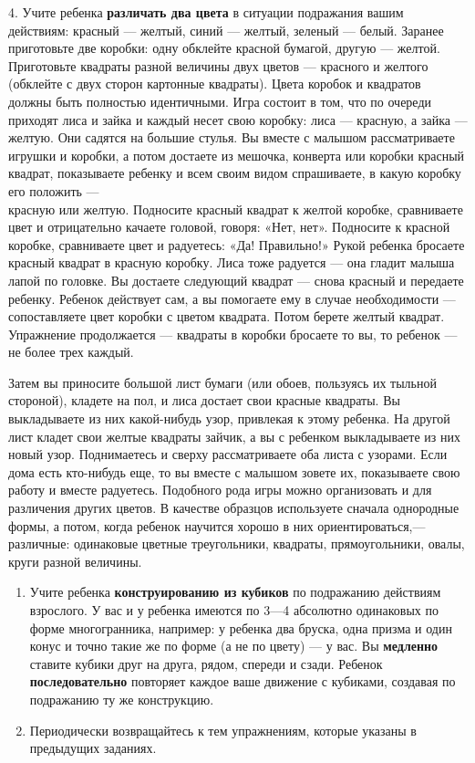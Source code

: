 \documentclass{book}
\begin{document}
4. Учите ребенка \textbf{различать два цвета} в ситуации подражания
вашим действиям: красный --- желтый, синий --- желтый, зеленый ---
белый. Заранее приготовьте две коробки: одну обклейте красной бумагой,
другую --- желтой. Приготовьте квадраты разной величины двух цветов ---
красного и желтого (обклейте с двух сторон картонные квадраты). Цвета
коробок и квадратов должны быть полностью идентичными. Игра состоит в
том, что по очереди приходят лиса и зайка и каждый несет свою коробку:
лиса --- красную, а зайка --- желтую. Они садятся на большие стулья. Вы
вместе с малышом рассматриваете игрушки и коробки, а потом достаете из
мешочка, конверта или коробки красный квадрат, показываете ребенку и
всем своим видом спрашиваете, в какую коробку его положить ---\\
красную или желтую. Подносите красный квадрат к желтой коробке,
сравниваете цвет и отрицательно качаете головой, говоря: «Нет, нет».
Подносите к красной коробке, сравниваете цвет и радуетесь: «Да!
Правильно!» Рукой ребенка бросаете красный квадрат в красную коробку.
Лиса тоже радуется --- она гладит малыша лапой по головке. Вы достаете
следующий квадрат --- снова красный и передаете ребенку. Ребенок
действует сам, а вы помогаете ему в случае необходимости ---
сопоставляете цвет коробки с цветом квадрата. Потом берете желтый
квадрат. Упражнение продолжается --- квадраты в коробки бросаете то вы,
то ребенок --- не более трех каждый.

Затем вы приносите большой лист бумаги (или обоев, пользуясь их тыльной
стороной), кладете на пол, и лиса достает свои красные квадраты. Вы
выкладываете из них какой-нибудь узор, привлекая к этому ребенка. На
другой лист кладет свои желтые квадраты зайчик, а вы с ребенком
выкладываете из них новый узор. Поднимаетесь и сверху рассматриваете оба
листа с узорами. Если дома есть кто-нибудь еще, то вы вместе с малышом
зовете их, показываете свою работу и вместе радуетесь. Подобного рода
игры можно организовать и для различения других цветов. В качестве
образцов используете сначала однородные формы, а потом, когда ребенок
научится хорошо в них ориентироваться,--- различные: одинаковые цветные
треугольники, квадраты, прямоугольники, овалы, круги разной величины.


\begin{enumerate}
\def\labelenumi{\arabic{enumi}.}
\setcounter{enumi}{4}
\item
  
  Учите ребенка \textbf{конструированию из кубиков} по подражанию
  действиям взрослого. У вас и у ребенка имеются по 3---4 абсолютно
  одинаковых по форме многогранника, например: у ребенка два бруска,
  одна призма и один конус и точно такие же по форме (а не по цвету) ---
  у вас. Вы \textbf{медленно} ставите кубики друг на друга, рядом,
  спереди и сзади. Ребенок \textbf{последовательно} повторяет каждое
  ваше движение с кубиками, создавая по подражанию ту же конструкцию.
  
\item
  
  Периодически возвращайтесь к тем упражнениям, которые указаны в
  предыдущих заданиях.
  
\end{enumerate}
\end{document}
